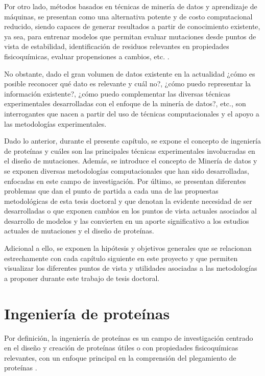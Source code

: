 Por otro lado, métodos basados en técnicas de minería de datos y aprendizaje de máquinas, se presentan como una alternativa potente y de costo computacional reducido, siendo capaces de generar resultados a partir de conocimiento existente, ya sea, para entrenar modelos que permitan evaluar mutaciones desde puntos de vista de estabilidad, identificación de residuos relevantes en propiedades fisicoquímicas, evaluar propensiones a cambios, etc. \cite{Capriotti2005, softwareVHL, article}. 

No obstante, dado el gran volumen de datos existente en la actualidad ¿cómo es posible reconocer qué dato es relevante y cuál no?, ¿cómo puedo representar la información existente?, ¿cómo puedo complementar las diversas técnicas experimentales desarrolladas con el enfoque de la minería de datos?, etc., son interrogantes que nacen a partir del uso de técnicas computacionales y el apoyo a las metodologías experimentales.

Dado lo anterior, durante el presente capítulo, se expone el concepto de ingeniería de proteínas y cuáles son las principales técnicas experimentales involucradas en el diseño de mutaciones. Además, se introduce el concepto de Minería de datos y se exponen diversas metodologías computacionales que han sido desarrolladas, enfocadas en este campo de investigación. Por último, se presentan diferentes problemas que dan el punto de partida a cada una de las propuestas metodológicas de esta tesis doctoral y que denotan la evidente necesidad de ser desarrolladas o que exponen cambios en los puntos de vista actuales asociados al desarrollo de modelos y las convierten en un aporte significativo a los estudios actuales de mutaciones y el diseño de proteínas. 

Adicional a ello, se exponen la hipótesis y objetivos generales que se relacionan estrechamente con cada capítulo siguiente en este proyecto y que permiten visualizar los diferentes puntos de vista y utilidades asociadas a las metodologías a proponer durante este trabajo de tesis doctoral.

\section{Ingeniería de proteínas \label{cap1:sec1}}

Por definición, la ingeniería de proteínas es un campo de investigación centrado en el diseño y creación de proteínas útiles o con propiedades fisicoquímicas relevantes, con un enfoque principal en la comprensión del plegamiento de proteínas \cite{liszewski2015speeding}.

